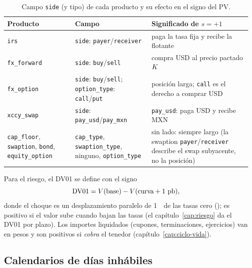 \begin{sloppypar}
\begin{table}[ht]
  \centering\small
  \caption{Campo \texttt{side} (y tipo) de cada producto y su efecto en el signo del PV.}\label{tab:cap01-signos}
  \begin{tabular}{@{}>{\raggedright\arraybackslash}p{3.0cm}>{\raggedright\arraybackslash}p{4.0cm}>{\raggedright\arraybackslash}p{7.3cm}@{}}
    \toprule
    Producto & Campo & Significado de $s=+1$ \\
    \midrule
    \texttt{irs} & \texttt{side}: \texttt{payer}/\texttt{receiver} & paga la tasa fija y recibe la flotante \\
    \texttt{fx\_forward} & \texttt{side}: \texttt{buy}/\texttt{sell} & compra USD al precio pactado $K$ \\
    \texttt{fx\_option} & \texttt{side}: \texttt{buy}/\texttt{sell}; \texttt{option\_type}: \texttt{call}/\texttt{put} & posición larga; \texttt{call} es el derecho a comprar USD \\
    \texttt{xccy\_swap} & \texttt{side}: \texttt{pay\_usd}/\texttt{pay\_mxn} & \texttt{pay\_usd}: paga USD y recibe MXN \\
    \texttt{cap\_floor}, \texttt{swaption}, \texttt{bond}, \texttt{equity\_option} & \texttt{cap\_type}, \texttt{swaption\_type}, ninguno, \texttt{option\_type} & sin lado: siempre largo (la swaption \texttt{payer}/\texttt{receiver} describe el swap subyacente, no la posición) \\
    \bottomrule
  \end{tabular}
\end{table}

Para el riesgo, el DV01 se define con el signo
\begin{equation}\label{eq:cap01-dv01}
  \mathrm{DV01} = V(\text{base})-V(\text{curva}+1~\textup{pb}),
\end{equation}
donde el choque es un desplazamiento paralelo de 1~\pb\ de las tasas cero
(); es positivo si el valor sube cuando
bajan las tasas (el capítulo~\ref{cap:riesgo} da el DV01 por plazo). Los importes liquidados (cupones,
terminaciones, ejercicios) van en pesos y son positivos si \emph{cobra} el tenedor
(capítulo~\ref{cap:ciclo-vida}).

\subsection{Calendarios de días inhábiles}\label{sec:cap01-calendarios}


\end{sloppypar}
